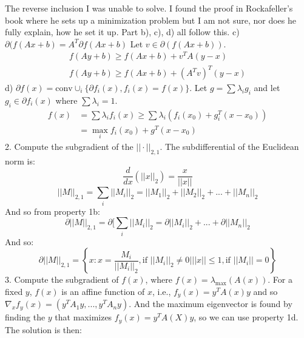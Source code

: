 \documentclass{article}
\begin{document}
The reverse inclusion I was unable to solve. I found the proof in Rockafeller's book where he sets up a minimization problem but I am not sure, nor does he fully explain, how he set it up. Part b), c), d) all follow this.
\newline\newline
c) $\partial(f(Ax + b) = A^T\partial f(Ax + b)$
Let $v \in \partial(f(Ax+b))$. 
\begin{align*}
	f(Ay+b) \geq f(Ax + b) + v^TA(y-x) \\
	f(Ay + b) \geq f(Ax + b)  + (A^Tv)^T(y - x)
\end{align*}
d) $\partial f(x) = \text{conv} \cup_i \{\partial f_i(x), f_i(x)  = f(x)\}$. \newline
Let $g = \sum{\lambda_ig_i}$ and let $g_i \in \partial f_i(x)$ where $\sum{\lambda_i} = 1$. 
\begin{align*}
	f(x) &= \sum{\lambda_if_i(x)} \geq \sum{\lambda_i(f_i(x_0) + g_i^T(x - x_0))} \\
	&= \max_i f_i(x_0) + g^T(x - x_0)
\end{align*}
2. Compute the subgradient of the $||\cdot||_{2,1}$. \newline\newline
The subdifferential of the Euclidean norm is:
\begin{equation*}
	\frac{d}{dx}(||x||_2) = \frac{x}{||x||}
\end{equation*}
\begin{equation*}
	||M||_{2,1} = \sum_i{||M_i||_2} = ||M_1||_2 + ||M_2||_2 + ... + ||M_n||_2
\end{equation*}
And so from property 1b:
\begin{equation*}
	\partial ||M||_{2,1} = \partial [\sum_i{||M_i||_2} = \partial ||M_i||_2 + ... + \partial ||M_n||_2
\end{equation*}
And so:
\begin{equation*}
	\partial ||M||_{2,1} = \left\{x: x = \frac{M_i}{||M_i||_2}, \text{if } ||M_i||_2 \neq 0 | ||x|| \leq 1, \text{if } ||M_i|| = 0\right\}
\end{equation*}
3. Compute the subgradient of $f(x)$, where $f(x) = \lambda_{\text{max}}(A(x))$. \newline\newline
For a fixed $y$, $f(x)$ is an affine function of $x$, i.e., $f_y(x) = y^TA(x)y$ and so $\nabla_x f_y(x) = (y^TA_1y, ..., y^TA_ny)$. And the maximum eigenvector is found by finding the $y$ that maximizes $f_y(x) = y^TA(X)y$, so we can use property 1d. The solution is then:
\end{document}
